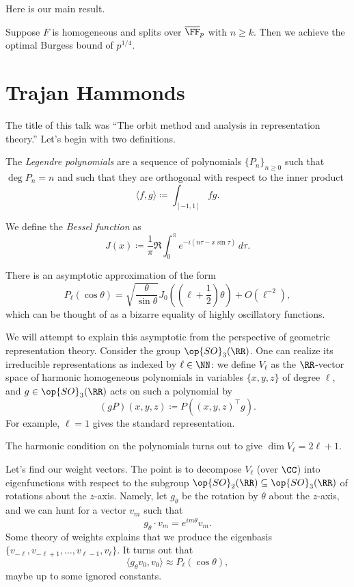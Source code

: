 \documentclass{article}
\begin{document}
Here is our main result.
\begin{theorem}[C]
	Suppose $F$ is homogeneous and splits over $\overline\FF_p$ with $n\ge k$. Then we achieve the optimal Burgess bound of $p^{1/4}$.
\end{theorem}

\section{Trajan Hammonds}
The title of this talk was ``The orbit method and analysis in representation theory.'' Let's begin with two definitions.
\begin{definition}
	The \textit{Legendre polynomials} are a sequence of polynomials $\{P_n\}_{n\ge0}$ such that $\deg P_n=n$ and such that they are orthogonal with respect to the inner product
	\[\langle f,g\rangle\coloneqq\int_{[-1,1]}fg.\]
\end{definition}
\begin{definition}
	We define the \textit{Bessel function} as
	\[J(x)\coloneqq\frac1\pi\Re\int_0^\pi e^{-i(n\tau-x\sin\tau)}\,d\tau.\]
\end{definition}
There is an asymptotic approximation of the form
\[P_\ell(\cos\theta)=\sqrt{\frac{\theta}{\sin\theta}}J_0\left(\left(\ell+\frac12\right)\theta\right)+O\left(\ell^{-2}\right),\]
which can be thought of as a bizarre equality of highly oscillatory functions.

We will attempt to explain this asymptotic from the perspective of geometric representation theory. Consider the group $\op{SO}_3(\RR)$. One can realize its irreducible representations as indexed by $\ell\in\NN$: we define $V_\ell$ as the $\RR$-vector space of harmonic homogeneous polynomials in variables $\{x,y,z\}$ of degree $\ell$, and $g\in\op{SO}_3(\RR)$ acts on such a polynomial by
\[(gP)(x,y,z)\coloneqq P((x,y,z)^\intercal g).\]
For example, $\ell=1$ gives the standard representation.
\begin{remark}
	The harmonic condition on the polynomials turns out to give $\dim V_\ell=2\ell+1$.
\end{remark}
Let's find our weight vectors. The point is to decompose $V_\ell$ (over $\CC$) into eigenfunctions with respect to the subgroup $\op{SO}_2(\RR)\subseteq\op{SO}_3(\RR)$ of rotations about the $z$-axis. Namely, let $g_\theta$ be the rotation by $\theta$ about the $z$-axis, and we can hunt for a vector $v_m$ such that
\[g_\theta\cdot v_m=e^{im\theta}v_m.\]
Some theory of weights explains that we produce the eigenbasis $\{v_{-\ell},v_{-\ell+1},\ldots,v_{\ell-1},v_\ell\}$. It turns out that
\[\langle g_\theta v_0,v_0\rangle\approx P_\ell(\cos\theta),\]
maybe up to some ignored constants.
\end{document}
